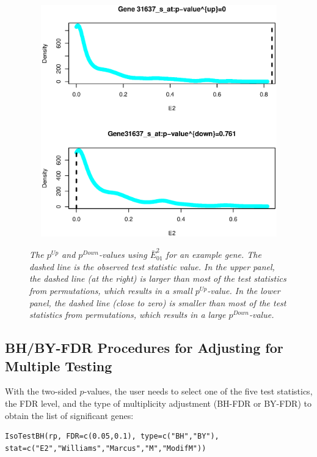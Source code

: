 \begin{figure}[!h]
\centering
{\includegraphics[height=10cm,width=12cm]{Isopval.eps}}
\caption{\em{The $p^{Up}$ and $p^{Down}$-values using
$\bar{E}_{01}^2$ for an example gene. The dashed line is the
observed test statistic value. In the upper panel, the dashed line
(at the right) is larger than most of the test statistics from
permutations, which results in a small $p^{Up}$-value. In the lower
panel, the dashed line (close to zero) is smaller than most of the
test statistics from permutations, which results in a large
$p^{Down}$-value.}} \label{expvalue}
\end{figure}



\subsection{BH/BY-FDR Procedures for Adjusting for Multiple Testing}

With the two-sided $p$-values, the user needs to select one of the
five test statistics, the FDR level, and the type of multiplicity
adjustment (BH-FDR or BY-FDR) to obtain the list of significant
genes:
\begin{center}
\begin{boxit}
\begin{verbatim}
IsoTestBH(rp, FDR=c(0.05,0.1), type=c("BH","BY"),
stat=c("E2","Williams","Marcus","M","ModifM"))
\end{verbatim}
\end{boxit}
\end{center}

